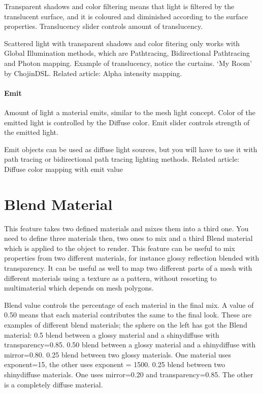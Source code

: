 Transparent shadows and color filtering means that light is filtered by the translucent surface, and it is coloured and diminished according to the surface properties. Translucency slider controls amount of translucency.


Scattered light with transparent shadows and color fitering only works with Global Illumination methods, which are Pathtracing, Bidirectional Pathtracing and Photon mapping.
Example of translucency, notice the curtains. `My Room' by ChojinDSL.
Related article: Alpha intensity mapping.

\paragraph{Emit}

Amount of light a material emits, similar to the mesh light concept. Color of the emitted light is controlled by the Diffuse color. Emit slider controls strength of the emitted light.

Emit objects can be used as diffuse light sources, but you will have to use it with path tracing or bidirectional path tracing lighting methods.
Related article: Diffuse color mapping with emit value


\section{Blend Material}

This feature takes two defined materials and mixes them into a third one. You need to define three materials then, two ones to mix and a third Blend material which is applied to the object to render. This feature can be useful to mix properties from two different materials, for instance glossy reflection blended with transparency. It can be useful as well to map two different parts of a mesh with different materials using a texture as a pattern, without resorting to multimaterial which depends on mesh polygons.

Blend value controls the percentage of each material in the final mix. A value of 0.50 means that each material contributes the same to the final look. These are examples of different blend materials; the sphere on the left has got the Blend material:
0.5 blend between a glossy material and a shinydiffuse with transparency=0.85.
0.50 blend between a glossy material and a shinydiffuse with mirror=0.80.
0.25 blend between two glossy materials. One material uses exponent=15, the other uses exponent = 1500.
0.25 blend between two shinydiffuse materials. One uses mirror=0.20 and transparency=0.85. The other is a completely diffuse material.
